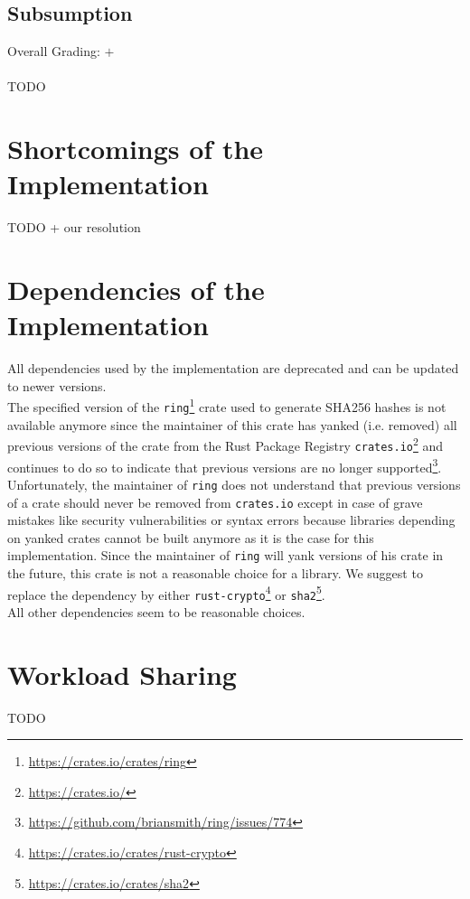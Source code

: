 \documentclass[a4paper, 11pt]{article}
\begin{document}
\subsection*{Subsumption}
Overall Grading: $+$\\
\\
TODO

\section*{Shortcomings of the Implementation}
TODO + our resolution


\section*{Dependencies of the Implementation}
All dependencies used by the implementation are deprecated and can be updated to newer versions.\\
The specified version of the \texttt{ring}\footnote{\url{https://crates.io/crates/ring}} crate used to generate SHA256 hashes is not available anymore since the maintainer of this crate has yanked (i.e. removed) all previous versions of the crate from the Rust Package Registry \texttt{crates.io}\footnote{\url{https://crates.io/}} and continues to do so to indicate that previous versions are no longer supported\footnote{\url{https://github.com/briansmith/ring/issues/774}}.
Unfortunately, the maintainer of \texttt{ring} does not understand that previous versions of a crate should never be removed from \texttt{crates.io} except in case of grave mistakes like security vulnerabilities or syntax errors because libraries depending on yanked crates cannot be built anymore as it is the case for this implementation.
Since the maintainer of \texttt{ring} will yank versions of his crate in the future, this crate is not a reasonable choice for a library.
We suggest to replace the dependency by either \texttt{rust-crypto}\footnote{\url{https://crates.io/crates/rust-crypto}} or \texttt{sha2}\footnote{\url{https://crates.io/crates/sha2}}.\\
All other dependencies seem to be reasonable choices.

\section*{Workload Sharing}
TODO
\end{document}
